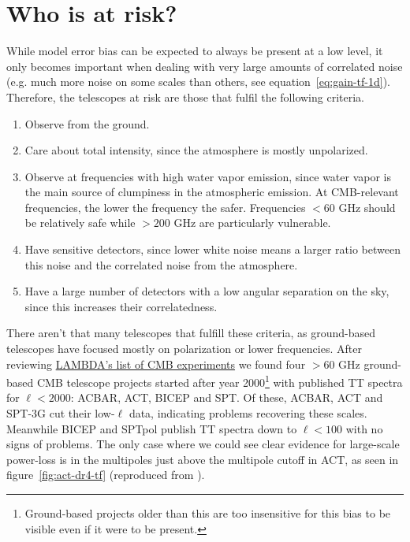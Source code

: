 \documentclass[twocolumn,apj]{aastex63}
\begin{document}
\section{Who is at risk?}
While model error bias can be expected to always be present at a
low level, it only becomes important when dealing with very large amounts
of correlated noise (e.g. much more noise on some scales than others,
see equation~\ref{eq:gain-tf-1d}). Therefore, the telescopes at risk are
those that fulfil the following criteria.
\begin{enumerate}
	\item Observe from the ground.
	\item Care about total intensity, since the atmosphere is mostly unpolarized.
	\item Observe at frequencies with high water vapor emission, since
		water vapor is the main source of clumpiness in the atmospheric emission.
		At CMB-relevant frequencies, the lower the frequency the safer.
		Frequencies $<60$ GHz should be relatively safe while $>200$ GHz are
		particularly vulnerable.
	\item Have sensitive detectors, since lower white noise means a larger
		ratio between this noise and the correlated noise from the atmosphere.
	\item Have a large number of detectors with a low angular separation on
		the sky, since this increases their correlatedness.
\end{enumerate}
There aren't that many telescopes that fulfill these criteria, as ground-based
telescopes have focused mostly on polarization or lower frequencies. After reviewing
\href{https://lambda.gsfc.nasa.gov/product/expt}{LAMBDA's list of CMB experiments}
we found four $>60$ GHz ground-based CMB telescope projects started after year 2000\footnote{
	Ground-based projects older than this are too insensitive for this bias to be visible even if
	it were to be present.}
with published TT spectra for $\ell < 2000$: ACBAR, ACT, BICEP and SPT. Of these,
ACBAR, ACT \citep{choi/etal:2020} and SPT-3G \citep{spt3g-ps-2022} cut their low-$\ell$ data, indicating problems recovering
these scales. Meanwhile BICEP \citep{barkats/etal/2013, bicep-keck-ps-2018} and SPTpol \citep{sptpol-ps-2018} publish TT spectra down to $\ell < 100$ with
no signs of problems. The only case where we could see clear evidence for large-scale
power-loss is in the multipoles just above the multipole cutoff in ACT, as seen in
figure~\ref{fig:act-dr4-tf} (reproduced from \citet{choi/etal:2020}).
\end{document}
